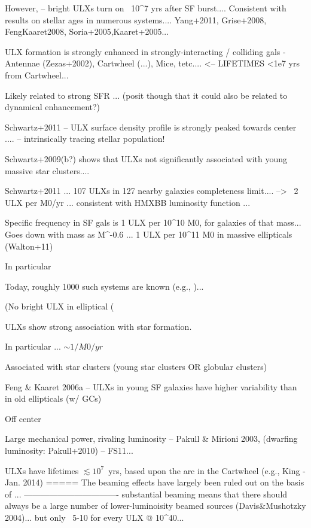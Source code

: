 However, \citet{Schwartz_2009} -- bright ULXs turn on ~10^7 yrs after SF burst.... Consistent with results on stellar ages in numerous systems....  Yang+2011, Grise+2008, FengKaaret2008, Soria+2005,Kaaret+2005...

ULX formation is strongly enhanced in strongly-interacting / colliding gals - Antennae (Zezas+2002), Cartwheel (...), Mice, tetc....    <-- LIFETIMES <1e7 yrs  from Cartwheel...

Likely related to strong SFR ... (posit though that it could also be related to dynamical enhancement?)


Schwartz+2011 -- ULX surface density profile is strongly peaked towards center .... -- intrinsically tracing stellar population!

Schwartz+2009(b?) shows that ULXs not significantly associated with young massive star clusters....

Schwartz+2011 ... 107 ULXs in 127 nearby galaxies completeness limit.... -->  ~2 ULX per  M0/yr  ... consistent with HMXBB luminosity function ...

Specific frequency in SF gals is 1 ULX per 10^10 M0, for galaxies of that mass...  Goes down with mass as M^-0.6 ...   1 ULX per 10^11 M0 in massive ellipticals (Walton+11)






In particular




Today, roughly 1000 such systems are known (e.g., \citep{Walton_2011, ...2011s})...

(No bright ULX in elliptical (

ULXs show strong association with star formation.  

In particular ...
$\sim 1 / M0/yr$


Associated with star clusters (young star clusters OR globular clusters)

Feng & Kaaret 2006a -- ULXs in young SF galaxies have higher variability than in old ellipticals (w/ GCs)

Off center

Large mechanical power, rivaling luminosity -- Pakull & Mirioni 2003, (dwarfing luminosity: Pakull+2010) -- FS11...  

ULXs have lifetimes $\lesssim 10^7$~yrs, based upon the arc in the Cartwheel (e.g., King - Jan. 2014)
=====
The beaming effects have largely been ruled out on the basis of ...  
----------------------------------
substantial beaming means that there should always be a large number of lower-luminoisity beamed sources (Davis&Mushotzky 2004)... but only ~5-10 for every ULX @ 10^40...  

